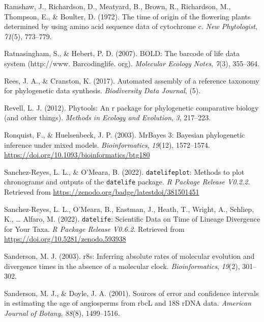\documentclass[
  english,
  man]{apa6}
\newlength{\cslhangindent}
\newlength{\cslentryspacingunit} %
\newenvironment{CSLReferences}[2] %
 {%
  \setlength{\parindent}{0pt}
  \ifodd #1
  \let\oldpar\par
  \def\par{\hangindent=\cslhangindent\oldpar}
  \fi
  \setlength{\parskip}{#2\cslentryspacingunit}
 }%
 {}
\begin{document}
\begin{CSLReferences}{1}{0}
\leavevmode{}%
Ramshaw, J., Richardson, D., Meatyard, B., Brown, R., Richardson, M., Thompson, E., \& Boulter, D. (1972). The time of origin of the flowering plants determined by using amino acid sequence data of cytochrome c. \emph{New Phytologist}, \emph{71}(5), 773--779.

\leavevmode{}%
Ratnasingham, S., \& Hebert, P. D. (2007). BOLD: The barcode of life data system (http://www. Barcodinglife. org). \emph{Molecular Ecology Notes}, \emph{7}(3), 355--364.

\leavevmode{}%
Rees, J. A., \& Cranston, K. (2017). Automated assembly of a reference taxonomy for phylogenetic data synthesis. \emph{Biodiversity Data Journal}, (5).

\leavevmode{}%
Revell, L. J. (2012). Phytools: An r package for phylogenetic comparative biology (and other things). \emph{{Methods in Ecology and Evolution}}, \emph{3}, 217--223.

\leavevmode{}%
Ronquist, F., \& Huelsenbeck, J. P. (2003). {MrBayes 3: Bayesian phylogenetic inference under mixed models}. \emph{Bioinformatics}, \emph{19}(12), 1572--1574. \url{https://doi.org/10.1093/bioinformatics/btg180}

\leavevmode{}%
Sanchez-Reyes, L. L., \& O'Meara, B. (2022). {\texttt{datelifeplot}: Methods to plot chronograms and outputs of the \texttt{datelife} package}. \emph{R Package Release V0.2.2}. Retrieved from \url{https://zenodo.org/badge/latestdoi/381501451}

\leavevmode{}%
Sanchez-Reyes, L. L., O'Meara, B., Eastman, J., Heath, T., Wright, A., Schliep, K., \ldots{} Alfaro, M. (2022). {\texttt{datelife}: Scientific Data on Time of Lineage Divergence for Your Taxa}. \emph{R Package Release V0.6.2}. Retrieved from \url{https://doi.org/10.5281/zenodo.593938}

\leavevmode{}%
Sanderson, M. J. (2003). r8s: Inferring absolute rates of molecular evolution and divergence times in the absence of a molecular clock. \emph{Bioinformatics}, \emph{19}(2), 301--302.

\leavevmode{}%
Sanderson, M. J., \& Doyle, J. A. (2001). Sources of error and confidence intervals in estimating the age of angiosperms from rbcL and 18S rDNA data. \emph{American Journal of Botany}, \emph{88}(8), 1499--1516.


\end{CSLReferences}
\end{document}
